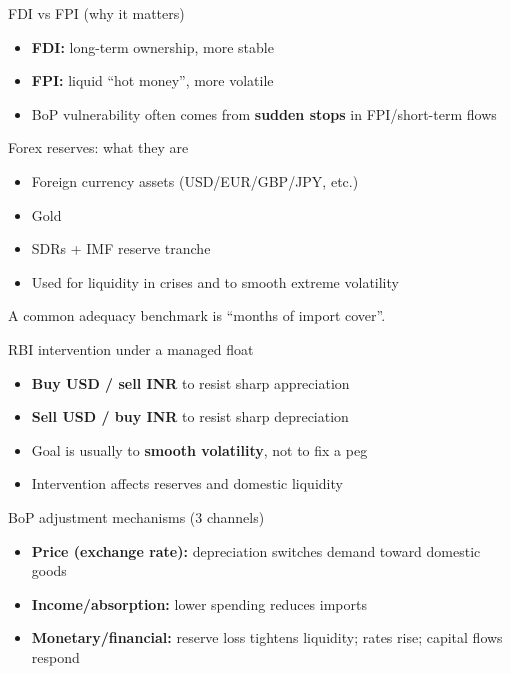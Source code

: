 \documentclass[
  ignorenonframetext,
  aspectratio=169,
]{beamer}
\makeatletter
\providecommand{\tightlist}{%
  \setlength{\itemsep}{0pt}\setlength{\parskip}{0pt}}
\let\quarto@originallabel\label
\DeclareRobustCommand*{\label}[1]{\quarto@originallabel{#1}}
\makeatother
\begin{document}
\begin{frame}{FDI vs FPI (why it matters)}
\label{fdi-vs-fpi-why-it-matters}
\begin{itemize}
\tightlist
\item
  \textbf{FDI:} long-term ownership, more stable
\item
  \textbf{FPI:} liquid ``hot money'', more volatile
\item
  BoP vulnerability often comes from \textbf{sudden stops} in
  FPI/short-term flows
\end{itemize}
\end{frame}

\begin{frame}{Forex reserves: what they are}
\label{forex-reserves-what-they-are}
\begin{itemize}
\tightlist
\item
  Foreign currency assets (USD/EUR/GBP/JPY, etc.)
\item
  Gold
\item
  SDRs + IMF reserve tranche
\item
  Used for liquidity in crises and to smooth extreme volatility
\end{itemize}

A common adequacy benchmark is ``months of import cover''.
\end{frame}

\begin{frame}{RBI intervention under a managed float}
\label{rbi-intervention-under-a-managed-float}
\begin{itemize}
\tightlist
\item
  \textbf{Buy USD / sell INR} to resist sharp appreciation
\item
  \textbf{Sell USD / buy INR} to resist sharp depreciation
\item
  Goal is usually to \textbf{smooth volatility}, not to fix a peg
\item
  Intervention affects reserves and domestic liquidity
\end{itemize}
\end{frame}

\begin{frame}{BoP adjustment mechanisms (3 channels)}
\label{bop-adjustment-mechanisms-3-channels}
\begin{itemize}
\tightlist
\item
  \textbf{Price (exchange rate):} depreciation switches demand toward
  domestic goods
\item
  \textbf{Income/absorption:} lower spending reduces imports
\item
  \textbf{Monetary/financial:} reserve loss tightens liquidity; rates
  rise; capital flows respond
\end{itemize}
\end{frame}
\end{document}
